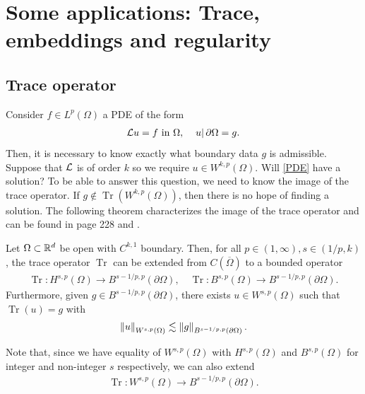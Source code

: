 \documentclass[
    a4paper,
    DIV=14,
    abstract=true,
    numbers=noenddot
]{scrartcl}
\begin{document}
\section{Some applications: Trace, embeddings and regularity}
\subsection{Trace operator}
Consider $f \in L^p(\Omega )$  a PDE of the form
\begin{align}\label{PDE}
    \mathcal{L} u =f \text{ in } \Omega , \quad \left.u\right|{\partial \Omega }= g.
\end{align}
Then, it is necessary to know exactly what boundary data $g$ is admissible. Suppose that $\mathcal{L} $ is of order $k$ so we require  $u \in W^{k,p}(\Omega )$. Will \eqref{PDE} have a solution? To be able to answer this question, we need to know the image of the trace operator. If $g \notin \operatorname{Tr}(W^{k,p}(\Omega ))$, then there is no hope of finding a solution. The following theorem characterizes the image of the trace operator and can be found in \cite{agranovich2015sobolev} page 228 and \cite[page 350, 492]{leoni2023first}.
\begin{theorem}\label{trace theorem}
    Let $\Omega \subset \mathbb{R}^d$ be open with $C^{k,1}$ boundary. Then, for all  $p\in (1,\infty), s\in (1/p,k) $, the trace operator $\operatorname{Tr}$ can be extended from $C(\overline{\Omega } )$  to a bounded operator
    \begin{align*}
        \operatorname{Tr}: H^{s,p}(\Omega ) \to B^{s-1/p,p}(\partial\Omega), \quad \operatorname{Tr}: B^{s,p}(\Omega ) \to B^{s-1/p,p}(\partial\Omega).
    \end{align*}
    Furthermore, given $g \in B^{s-1/p,p}(\partial\Omega)$, there exists $u \in W^{s,p}(\Omega )$ such that $\operatorname{Tr}(u)=g$ with
    \begin{align*}
        \left\lVert u \right\rVert_{W^{s,p}(\Omega )}\lesssim \left\lVert g \right\rVert_{B^{s-1/p,p}(\partial\Omega)}.
    \end{align*}
\end{theorem}
Note that, since we have equality of $W^{s,p}(\Omega )$ with $H^{s,p}(\Omega )$ and $B^{s,p}(\Omega )$ for integer and non-integer  $s$ respectively, we can also extend
\begin{align*}
    \operatorname{Tr}: W^{s,p}(\Omega ) \to B^{s-1/p,p}(\partial\Omega).
\end{align*}
\end{document}
